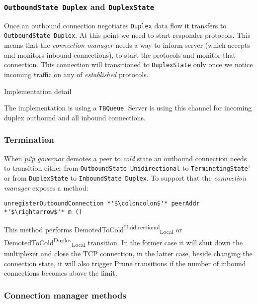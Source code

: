 \documentclass{article}
\def\TCP{\textsf{TCP}}
\def\OutboundStateUni{\texttt{OutboundState\phantom{\textsuperscript{$\tau$}} Unidirectional}}
\def\OutboundStateDup{\texttt{OutboundState\phantom{\textsuperscript{$\tau$}} Duplex}}
\def\DuplexState{\texttt{DuplexState}}
\def\InboundStateDup{\texttt{InboundState Duplex}}
\def\TerminatingState{\texttt{TerminatingState\textsuperscript{$\tau$}}}
\def\DemotedToColdDupLoc{\textsf{DemotedToCold}\textsuperscript{\textsf{Duplex}}\textsubscript{\textsf{Local}}}
\def\DemotedToColdUniLoc{\textsf{DemotedToCold}\textsuperscript{\textsf{Unidirectional}}\textsubscript{\textsf{Local}}}
\def\Prune{\textsf{Prune}}
\def\cold{\textit{cold}}
\def\established{\textit{established}}
\def\ptopgov{\textit{p2p governor}}
\def\connmngr{\textit{connection manager}}
\newenvironment{detail}
  {
    \begin{center}
    \begin{minipage}{0.9\textwidth}
      \begin{shaded}
      \small
      \noindent Implementation detail
      \vspace{0.3em}
      \newline
      \itshape
  }
  {
  \end{shaded}
  \end{minipage}
  \end{center}
  \vspace{1em}
  }
\begin{document}
\subsubsection{\OutboundStateDup{} and \DuplexState{}}
Once an outbound connection negotiates \texttt{Duplex} data flow it transfers
to \OutboundStateDup{}.  At this point we need to start responder protocols.
This means that the \connmngr{} needs a way to inform server (which
accepts and monitors inbound connections), to start the protocols and monitor
that connection.  This connection will transitioned to \DuplexState{} only once
we notice incoming traffic on any of \established{} protocols.

\begin{detail}
  The implementation is using a \texttt{TBQueue}.  Server is using this channel
  for incoming duplex outbound and all inbound connections.
\end{detail}

\subsubsection{Termination}\label{sec:outbound_termination}

When \ptopgov{} demotes a peer to \cold{} state an outbound
connection needs to transition either from \OutboundStateUni{} to
\TerminatingState{} or from \DuplexState{} to \InboundStateDup{}.  To
support that the \connmngr{} exposes a method:
\begin{lstlisting}
unregisterOutboundConnection *'$\coloncolon$'* peerAddr *'$\rightarrow$'* m ()
\end{lstlisting}
This method performs \DemotedToColdUniLoc{} or
\DemotedToColdDupLoc{} transition. In the former case it will shut down the
multiplexer and close the \TCP{} connection, in the latter case, beside
changing the connection state, it will also trigger \Prune{} transitions if
the number of inbound connections becomes above the limit.

\subsubsection{Connection manager methods}
\end{document}

